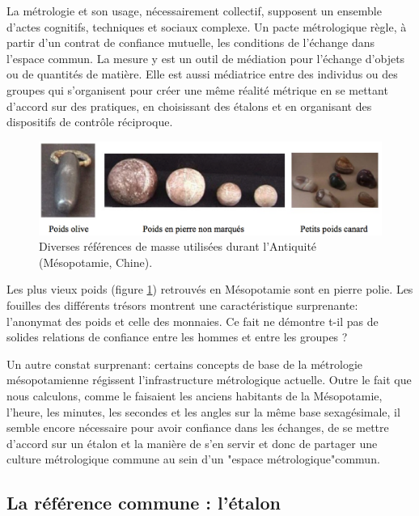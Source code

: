\documentclass[main.tex]{subfiles}
\begin{document}
La métrologie et son usage, nécessairement collectif, supposent un ensemble d'actes cognitifs, techniques et sociaux complexe.  Un pacte métrologique règle, à partir d'un contrat de confiance mutuelle, les conditions de l'échange dans l'espace commun.  La mesure y est un outil de médiation pour l'échange d'objets ou de quantités de matière.  Elle est aussi médiatrice entre des individus ou des groupes qui s'organisent pour créer une même réalité métrique en se mettant d'accord sur des pratiques, en choisissant des étalons et en organisant des dispositifs de contrôle réciproque.

\begin{figure}[h]
	\centering
	\includegraphics[width=15cm]{fig/poids.pdf}
    \caption{Diverses références de masse utilisées durant l'Antiquité (Mésopotamie, Chine).}
	\label{fig:1.1}
\end{figure}

Les plus vieux poids (figure \ref{fig:1.1}) retrouvés en Mésopotamie sont en pierre polie.  Les fouilles des différents trésors montrent une caractéristique surprenante: l'anonymat des poids et celle des monnaies.  Ce fait ne démontre t-il pas de solides relations de confiance entre les hommes et entre les groupes ?

Un autre constat surprenant: certains concepts de base de la métrologie mésopotamienne régissent l'infrastructure métrologique actuelle. Outre le fait que nous calculons, comme le faisaient les anciens habitants de la Mésopotamie, l'heure, les minutes, les secondes et les angles sur la même base sexagésimale, il semble encore nécessaire pour avoir confiance dans les échanges, de se mettre d'accord sur un étalon et la manière de s'en servir et donc de partager une culture métrologique commune au sein d'un "espace métrologique"commun.

\subsection{La référence commune : l'étalon}
\end{document}
